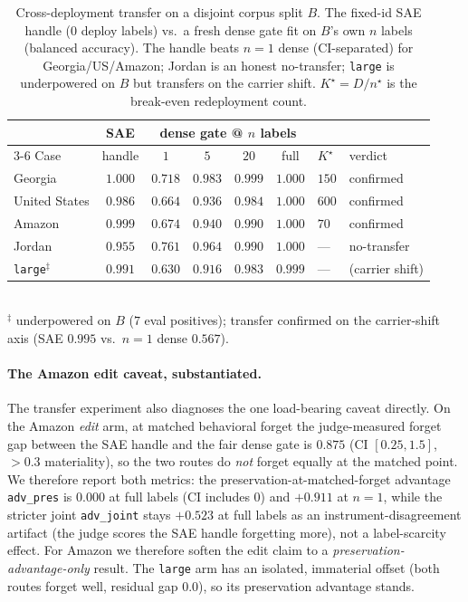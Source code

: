 \documentclass[11pt,letterpaper]{article}
\begin{document}
\begin{table}[t]
\centering\small
\caption{Cross-deployment transfer on a disjoint corpus split $B$. The fixed-id SAE handle ($0$ deploy labels) vs.\ a fresh dense gate fit on $B$'s own $n$ labels (balanced accuracy). The handle beats $n{=}1$ dense (CI-separated) for Georgia/US/Amazon; Jordan is an honest no-transfer; \texttt{large} is underpowered on $B$ but transfers on the carrier shift. $K^\star{=}D/n^\star$ is the break-even redeployment count.}
\label{tab:transfer}
\begin{tabular}{lcccccll}
\toprule
& SAE & \multicolumn{4}{c}{dense gate @ $n$ labels} & & \\
\cmidrule(lr){3-6}
Case & handle & $1$ & $5$ & $20$ & full & $K^\star$ & verdict \\
\midrule
Georgia & $1.000$ & $0.718$ & $0.983$ & $0.999$ & $1.000$ & $150$ & confirmed \\
United States & $0.986$ & $0.664$ & $0.936$ & $0.984$ & $1.000$ & $600$ & confirmed \\
Amazon & $0.999$ & $0.674$ & $0.940$ & $0.990$ & $1.000$ & $70$ & confirmed \\
Jordan & $0.955$ & $0.761$ & $0.964$ & $0.990$ & $1.000$ & --- & no-transfer \\
\texttt{large}$^\ddagger$ & $0.991$ & $0.630$ & $0.916$ & $0.983$ & $0.999$ & --- & (carrier shift) \\
\bottomrule
\end{tabular}
\\[2pt]
{\footnotesize $^\ddagger$ underpowered on $B$ ($7$ eval positives); transfer confirmed on the carrier-shift axis (SAE $0.995$ vs.\ $n{=}1$ dense $0.567$).}
\end{table}

\paragraph{The Amazon edit caveat, substantiated.} The transfer experiment also diagnoses the one load-bearing caveat directly. On the Amazon \emph{edit} arm, at matched behavioral forget the judge-measured forget gap between the SAE handle and the fair dense gate is $0.875$ (CI $[0.25,1.5]$, $>0.3$ materiality), so the two routes do \emph{not} forget equally at the matched point. We therefore report both metrics: the preservation-at-matched-forget advantage \texttt{adv\_pres} is $0.000$ at full labels (CI includes $0$) and $+0.911$ at $n{=}1$, while the stricter joint \texttt{adv\_joint} stays $+0.523$ at full labels as an instrument-disagreement artifact (the judge scores the SAE handle forgetting more), not a label-scarcity effect. For Amazon we therefore soften the edit claim to a \emph{preservation-advantage-only} result. The \texttt{large} arm has an isolated, immaterial offset (both routes forget well, residual gap $0.0$), so its preservation advantage stands.
\end{document}

